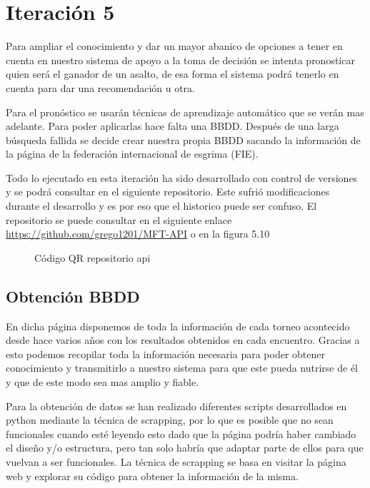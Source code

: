 \section{Iteración 5}


Para ampliar el conocimiento y dar un mayor abanico de opciones
a tener en cuenta en nuestro sistema de apoyo a la toma de decisión
se intenta pronosticar quien será el ganador de un asalto, de esa forma
el sistema podrá tenerlo en cuenta para dar una recomendación u otra.


Para el pronóstico se usarán técnicas de aprendizaje automático que se
verán mas adelante. Para poder aplicarlas hace falta una BBDD. Después de
una larga búsqueda fallida se decide crear nuestra propia BBDD sacando
la información de la página de la federación internacional de esgrima (FIE).

Todo lo ejecutado en esta iteración ha sido desarrollado con control de versiones
y se podrá consultar en el siguiente repositorio. Este sufrió modificaciones durante
el desarrollo y es por eso que el historico puede ser confuso. El repositorio se puede
consultar en el siguiente enlace \url{https://github.com/grego1201/MFT-API} o en la figura 5.10

\begin{figure}[htb]
  \centering
  \caption[Código QR repositorio api]{Código QR repositorio api}
  \label{fig:Código QR repositorio api}
\end{figure}

\subsection{Obtención BBDD}

En dicha página disponemos de toda la información de cada torneo acontecido
desde hace varios años con los resultados obtenidos en cada encuentro. Gracias
a esto podemos recopilar toda la información necesaria para poder obtener conocimiento
y transmitirlo a nuestro sistema para que este pueda nutrirse de él y que de este
modo sea mas amplio y fiable.

Para la obtención de datos se han realizado diferentes scripts desarrollados en
python mediante la técnica de scrapping, por lo que es posible que no sean funcionales
cuando esté leyendo esto dado que la página podría haber cambiado el diseño y/o
estructura, pero tan solo habría que adaptar parte de ellos para que vuelvan a
ser funcionales. La técnica de scrapping se basa en visitar la página web y
explorar su código para obtener la información de la misma.

